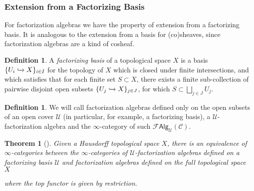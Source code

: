 \documentclass[12pt,a4paper]{article}
\newcounter{counter} \numberwithin{counter}{section}
\theoremstyle{definition}
\newtheorem{definition}[counter]{Definition}
\theoremstyle{plain}
\newtheorem{theorem}[counter]{Theorem}
\theoremstyle{remark}
\newcommand{\catC}{\mathscr{C}}
\newcommand{\falg}{\mathscr{F} \mathsf{Alg}}
\begin{document}
\subsubsection{Extension from a Factorizing Basis}

For factorization algebras we have the property of extension from a factorizing basis. It is analogous to the extension from a basis for (co)sheaves, since factorization algebras are a kind of cosheaf.

\begin{definition}
    A \emph{factorizing basis} of a topological space $X$ is a basis $\{ U_i \xhookrightarrow{} X\}_{i \in I}$ for the topology of $X$ which is closed under finite intersections, and which satisfies that for each finite set $S \subset X$, there exists a finite sub-collection of pairwise disjoint open subsets $\{ U_j \xhookrightarrow{} X\}_{j \in J}$, for which $S \subset \bigsqcup_{j \in J} U_j$.
\end{definition}

\begin{definition}
    We will call factorization algebras defined only on the open subsets of an open cover $\mathscr{U}$ (in particular, for example, a factorizing basis), a $\mathscr{U}$-factorization algebra and the $\infty$-category of such $\falg_{\mathscr{U}}(\catC)$.
\end{definition}

\begin{theorem}[\cite{cg2016}]\label{thm:fa_from_basis}
    Given a Hausdorff topological space $X$, there is an equivalence of $\infty$-categories between the $\infty$-categories of $\mathscr{U}$-factorization algebras defined on a factorizing basis $\mathscr{U}$ and factorization algebras defined on the full topological space $X$
    \begin{center}
    \end{center}
    where the top functor is given by restriction.
\end{theorem}
\end{document}
